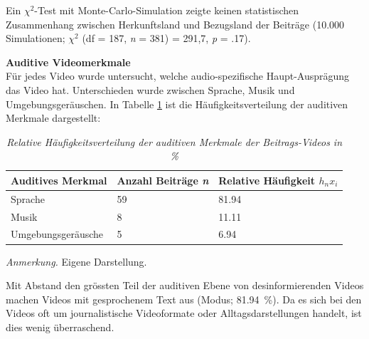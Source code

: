 \documentclass[12pt,a4paper]{article}        %
\begin{document}
\pagebreak
Ein \(\chi^2\)-Test mit Monte-Carlo-Simulation zeigte keinen statistischen Zusammenhang zwischen Herkunftsland und Bezugsland der Beiträge (10.000 Simulationen; \(\chi^2\) (df = 187, \textit{n} = 381) = 291,7,  \textit{p} = .17).

\textbf{Auditive Videomerkmale}\\
Für jedes Video wurde untersucht, welche audio-spezifische Haupt-Ausprägung das Video hat. Unterschieden wurde zwischen Sprache, Musik und Umgebungsgeräuschen. In Tabelle \ref{tab:results_auditive_specifications} ist die Häufigkeitsverteilung der auditiven Merkmale dargestellt:
\begin{table}[H]
  \caption{\textit{Relative Häufigkeitsverteilung der auditiven Merkmale der Beitrags-Videos in \%}}
  \label{tab:results_auditive_specifications}
  \centering
  \begin{tabular}{|l|l|l|} \hline
    \textbf{Auditives Merkmal} & \textbf{Anzahl Beiträge \textit{n}}& \textbf{Relative Häufigkeit \({h_n}{x_i}\)} \\ \hline
    Sprache & 59 & 81.94 \\ \hline
    Musik & 8 & 11.11 \\ \hline
    Umgebungsgeräusche & 5 & 6.94 \\ \hline
  \end{tabular}
  \footnotesize\textit{Anmerkung.} Eigene Darstellung.
\end{table}
Mit Abstand den grössten Teil der auditiven Ebene von desinformierenden Videos machen Videos mit gesprochenem Text aus (Modus; 81.94 \%). Da es sich bei den Videos oft um journalistische Videoformate oder Alltagsdarstellungen handelt, ist dies wenig überraschend.
\end{document}
